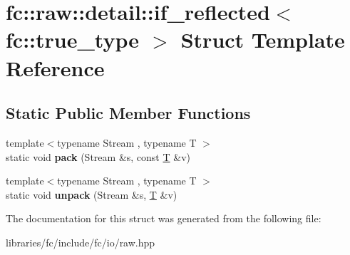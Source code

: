 \hypertarget{structfc_1_1raw_1_1detail_1_1if__reflected_3_01fc_1_1true__type_01_4}{}\section{fc\+:\+:raw\+:\+:detail\+:\+:if\+\_\+reflected$<$ fc\+:\+:true\+\_\+type $>$ Struct Template Reference}
\label{structfc_1_1raw_1_1detail_1_1if__reflected_3_01fc_1_1true__type_01_4}
\subsection*{Static Public Member Functions}
\begin{DoxyCompactItemize}
\item 
\mbox{\label{structfc_1_1raw_1_1detail_1_1if__reflected_3_01fc_1_1true__type_01_4_a068aadca7109f13b16857861a04256e2}} 
{\footnotesize template$<$typename Stream , typename T $>$ }\\static void {\bfseries pack} (Stream \&s, const \mbox{\hyperlink{struct_t}{T}} \&v)
\item 
\mbox{\label{structfc_1_1raw_1_1detail_1_1if__reflected_3_01fc_1_1true__type_01_4_a6e6d9c475b0eb964cb5fea1848353d03}} 
{\footnotesize template$<$typename Stream , typename T $>$ }\\static void {\bfseries unpack} (Stream \&s, \mbox{\hyperlink{struct_t}{T}} \&v)
\end{DoxyCompactItemize}


The documentation for this struct was generated from the following file\+:\begin{DoxyCompactItemize}
\item 
libraries/fc/include/fc/io/raw.\+hpp\end{DoxyCompactItemize}
